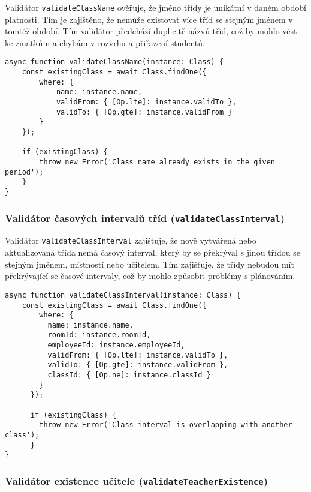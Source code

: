 Validátor \texttt{validateClassName} ověřuje, že jméno třídy je unikátní v daném období platnosti. Tím je zajištěno, že nemůže existovat více tříd se stejným jménem v tomtéž období. Tím validátor předchází duplicitě názvů tříd, což by mohlo vést ke zmatkům a chybám v rozvrhu a přiřazení studentů.

\begin{lstlisting}[title=Kód validátoru unikátnosti názvu třídy]
async function validateClassName(instance: Class) {
    const existingClass = await Class.findOne({
        where: {
            name: instance.name,
            validFrom: { [Op.lte]: instance.validTo },
            validTo: { [Op.gte]: instance.validFrom }
        }
    });

    if (existingClass) {
        throw new Error('Class name already exists in the given period');
    }
}
\end{lstlisting}

\subsubsection*{Validátor časových intervalů tříd (\texttt{validateClassInterval})}

Validátor \texttt{validateClassInterval} zajišťuje, že nově vytvářená nebo aktualizovaná třída nemá časový interval, který by se překrýval s jinou třídou se stejným jménem, místností nebo učitelem. Tím zajišťuje, že třídy nebudou mít překrývající se časové intervaly, což by mohlo způsobit problémy s plánováním.

\newpage
\begin{lstlisting}[title=Kód validátoru časových intervalů tříd]
async function validateClassInterval(instance: Class) {
    const existingClass = await Class.findOne({
        where: {
          name: instance.name,
          roomId: instance.roomId,
          employeeId: instance.employeeId,
          validFrom: { [Op.lte]: instance.validTo },
          validTo: { [Op.gte]: instance.validFrom },
          classId: { [Op.ne]: instance.classId }
        }
      });
    
      if (existingClass) {
        throw new Error('Class interval is overlapping with another class');
      }
}
\end{lstlisting}

\subsubsection*{Validátor existence učitele (\texttt{validateTeacherExistence})}

